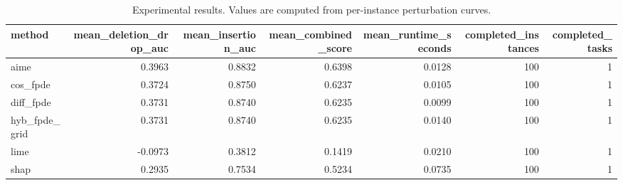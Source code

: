 \begin{table}[t]
\caption{Experimental results. Values are computed from per-instance perturbation curves.}
\label{tab:main_results_computed}
\centering
\begin{tabular}{lrrrrrr}
\toprule
method & mean\_deletion\_drop\_auc & mean\_insertion\_auc & mean\_combined\_score & mean\_runtime\_seconds & completed\_instances & completed\_tasks \\
\midrule
aime & 0.3963 & 0.8832 & 0.6398 & 0.0128 & 100 & 1 \\
cos\_fpde & 0.3724 & 0.8750 & 0.6237 & 0.0105 & 100 & 1 \\
diff\_fpde & 0.3731 & 0.8740 & 0.6235 & 0.0099 & 100 & 1 \\
hyb\_fpde\_grid & 0.3731 & 0.8740 & 0.6235 & 0.0140 & 100 & 1 \\
lime & -0.0973 & 0.3812 & 0.1419 & 0.0210 & 100 & 1 \\
shap & 0.2935 & 0.7534 & 0.5234 & 0.0735 & 100 & 1 \\
\bottomrule
\end{tabular}

\end{table}
